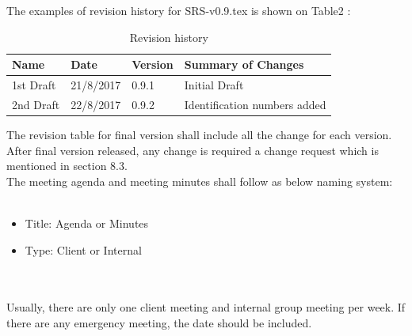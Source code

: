 The examples of revision history for SRS-v0.9.tex is shown on Table2 :\\

\begin{table}[]
	\centering
	\caption{Revision history}
	\label{my-label}
	\begin{tabular}{|l|l|l|l|}
		\hline
		Name      & Date      & Version & Summary of Changes           \\ \hline
		1st Draft & 21/8/2017 & 0.9.1   & Initial Draft                \\ \hline
		2nd Draft & 22/8/2017 & 0.9.2   & Identification numbers added \\ \hline
	\end{tabular}
\end{table}


The revision table for final version shall include all the change for each version. After final version released, any change is required a change request which is mentioned in section 8.3.\\


The meeting agenda and meeting minutes shall follow as below naming system:\\
\texttt{}\\
\begin{itemize}
\item Title: Agenda or Minutes
\item Type: Client or Internal
\end{itemize}
\texttt{} \\\\
Usually, there are only one client meeting and internal group meeting per week. If there are any emergency meeting, the date should be included.\\\\
\texttt{}\\
\texttt{}\\
